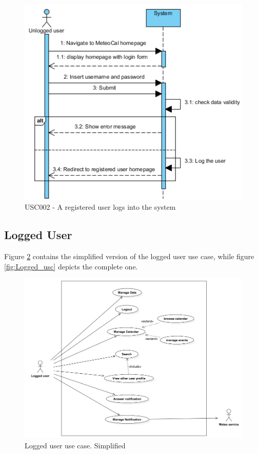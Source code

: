 \documentclass[10pt,a4paper,titlepage]{article}
\begin{document}
\begin{figure}[h]
\centering
\includegraphics[width=\linewidth]{./Sequence_diag/USC002.png}
\caption[USC002]{USC002 - A registered user logs into the system}
\label{fig:USC002}
\end{figure}

\clearpage
\subsection{Logged User}
Figure \ref{fig:Logged_usc_simple} contains the simplified version of the logged user use case, while figure \ref{fig:Logged_usc} depicts the complete one.

\begin{figure}[h!]
\centering
\includegraphics[width=\linewidth]{./Use_case/logged_usecase_simple.png}
\caption[Logged_usc_simple]{Logged user use case. Simplified}
\label{fig:Logged_usc_simple}
\end{figure}
\end{document}
